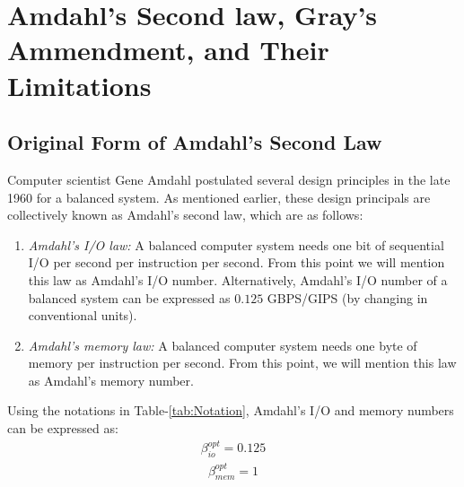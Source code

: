 \documentclass[journal]{IEEEtran}
\begin{document}

\section{Amdahl's Second law, Gray's Ammendment, and Their Limitations} \label{sec:AmdahlGray}
\subsection{Original Form of Amdahl's Second Law}
Computer scientist Gene Amdahl postulated several design principles in the late 1960 for a balanced system. As mentioned earlier, these design principals are collectively known as Amdahl's second law,  which are as follows:
\begin{enumerate}
\item \textit{Amdahl's I/O law:} A balanced computer system needs one bit of sequential I/O per second per instruction per second. From this point we will mention this law as Amdahl's I/O number. Alternatively, Amdahl's I/O number of a balanced system can be expressed as $0.125$ GBPS/GIPS (by changing in conventional units).
\item \textit{Amdahl's memory law:} A balanced computer system needs one byte of memory per instruction per second. From this point, we will mention this law as Amdahl's memory number.
\end{enumerate}
Using the notations in Table-\ref{tab:Notation}, Amdahl's I/O and memory numbers can be expressed as:
\begin{equation} \label{eqn:AmdahlIONotation}
\begin{split}
\beta_{io} ^{opt}= 0.125
\end{split}
\end{equation}
\begin{equation} \label{eqn:AmdahlMemNotation}
\begin{split}
\beta_{mem}^{opt} = 1
\end{split}
\end{equation}
\end{document}
